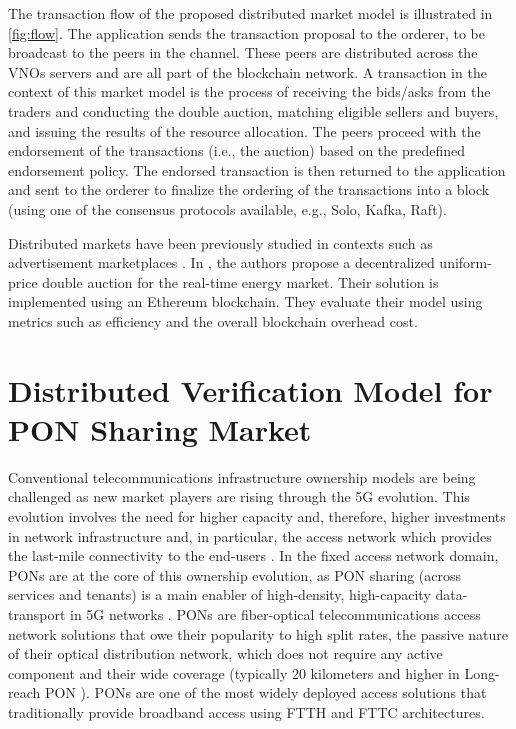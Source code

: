 The transaction flow of the proposed distributed market model is illustrated in \autoref{fig:flow}. The application sends the transaction proposal to the orderer, to be broadcast to the peers in the channel. These peers are distributed across the \acp{VNO} servers and are all part of the blockchain network. A transaction in the context of this market model is the process of receiving the bids/asks from the traders and conducting the double auction, matching eligible sellers and buyers, and issuing the results of the resource allocation. The peers proceed with the endorsement of the transactions (i.e., the auction) based on the predefined endorsement policy. The endorsed transaction is then returned to the application and sent to the orderer to finalize the ordering of the transactions into a block (using one of the consensus protocols available, e.g., Solo, Kafka, Raft).

Distributed markets have been previously studied in contexts such as advertisement marketplaces \cite{Ranganthan2018ADM}. In \cite{FOTI2019113604}, the authors propose a decentralized uniform-price double auction for the real-time energy market. Their solution is implemented using an Ethereum blockchain. They evaluate their model using metrics such as efficiency and the overall blockchain overhead cost. 




\section{Distributed Verification Model for \ac{PON} Sharing Market}
\label{BC:sec:pon}

Conventional telecommunications infrastructure ownership models are being challenged as new market players are rising through the \ac{5G} evolution. This evolution involves the need for higher capacity and, therefore, higher investments in network infrastructure and, in particular, the access network which provides the last-mile connectivity to the end-users \cite{Nima-5g-evol}.
In the fixed access network domain, \acp{PON} are at the core of this ownership evolution, as \ac{PON} sharing (across services and tenants) is a main enabler of high-density, high-capacity data-transport in \ac{5G} networks \cite{8412589}. \acp{PON} are fiber-optical telecommunications access network solutions that owe their popularity to high split rates, the passive nature of their optical distribution network, which does not require any active component and their wide coverage (typically 20 kilometers and higher in Long-reach \ac{PON} \cite{7592399}). \acp{PON} are one of the most widely deployed access solutions that traditionally provide broadband access using \ac{FTTH} and \ac{FTTC} architectures. 

